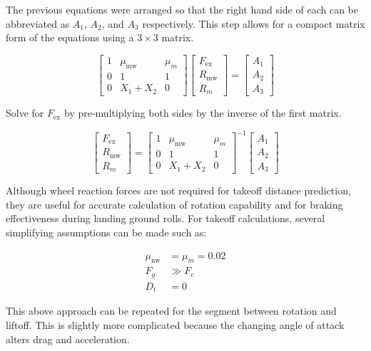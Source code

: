 \documentclass[
]{book}
\begin{document}
The previous equations were arranged so that the right hand side of each can be abbreviated as \(A_1\), \(A_2\), and \(A_3\) respectively.
This step allows for a compact matrix form of the equations using a \(3 \times 3\) matrix.

\[
\begin{bmatrix}
1 & \mu_{\text{mw}} & \mu_m \\
0 & 1 & 1 \\
0 & X_1 + X_2 & 0
\end{bmatrix}
\begin{bmatrix}
F_{\text{ex}} \\
R_{\text{mw}} \\
R_m
\end{bmatrix}
=
\begin{bmatrix}
A_1 \\
A_2 \\
A_3
\end{bmatrix}
\]

Solve for \(F_{\text{ex}}\) by pre-multiplying both sides by the inverse of the first matrix.

\[
\begin{bmatrix}
F_{\text{ex}} \\
R_{\text{mw}} \\
R_m
\end{bmatrix}
=
\begin{bmatrix}
1 & \mu_{\text{mw}} & \mu_m \\
0 & 1 & 1 \\
0 & X_1 + X_2 & 0
\end{bmatrix}^{-1}
\begin{bmatrix}
A_1 \\
A_2 \\
A_3
\end{bmatrix}
\]

Although wheel reaction forces are not required for takeoff distance prediction, they are useful for accurate calculation of rotation capability and for braking effectiveness during landing ground rolls.
For takeoff calculations, several simplifying assumptions can be made such as:

\begin{align}
\mu_{\text{nw}} &= \mu_m = 0.02 \\
F_g &\gg F_e \\
D_t &= 0
\end{align}

This above approach can be repeated for the segment between rotation and liftoff.
This is slightly more complicated because the changing angle of attack alters drag and acceleration.
\end{document}
